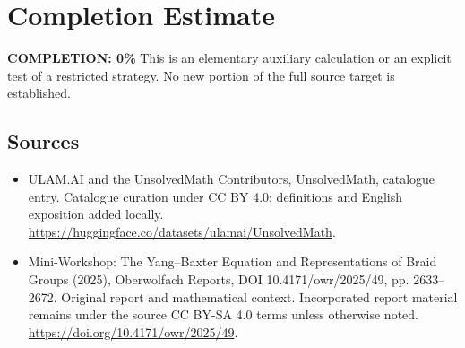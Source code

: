 \documentclass[11pt]{article}
\begin{document}
\section{Completion Estimate}
\noindent\textbf{COMPLETION: 0\%}
This is an elementary auxiliary calculation or an explicit test of a restricted strategy. No new portion of the full source target is established.

\subsection{Sources}
\begin{itemize}
\item[\hypertarget{source:statement:1}{S1}] ULAM.AI and the UnsolvedMath Contributors, UnsolvedMath, catalogue entry. Catalogue curation under CC BY 4.0; definitions and English exposition added locally.
\url{https://huggingface.co/datasets/ulamai/UnsolvedMath}.
\item[\hypertarget{source:statement:2}{S2}] Mini-Workshop: The Yang–Baxter Equation and Representations of Braid Groups (2025), Oberwolfach Reports, DOI 10.4171/owr/2025/49, pp. 2633--2672. Original report and mathematical context. Incorporated report material remains under the source CC BY-SA 4.0 terms unless otherwise noted.
\url{https://doi.org/10.4171/owr/2025/49}.
\end{itemize}
\label{end:statement}
\end{document}

